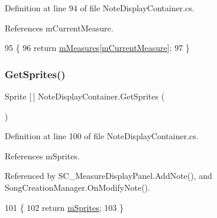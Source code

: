 Definition at line 94 of file Note\+Display\+Container.\+cs.



References m\+Current\+Measure.


\begin{DoxyCode}
95     \{
96         \textcolor{keywordflow}{return} \hyperlink{class_note_display_container_ae5ca6e7ea4ab2baaab9ff649bf25c0d6}{mMeasures}[\hyperlink{class_note_display_container_a79a97c9e0f45ba4242b66d6ec317d020}{mCurrentMeasure}];
97     \}
\end{DoxyCode}
\mbox{\label{class_note_display_container_a71bea931f237005ffb04e33baef71bef}} 
\subsubsection{\texorpdfstring{Get\+Sprites()}{GetSprites()}}
{\footnotesize\ttfamily Sprite \mbox{[}$\,$\mbox{]} Note\+Display\+Container.\+Get\+Sprites (\begin{DoxyParamCaption}{ }\end{DoxyParamCaption})}



Definition at line 100 of file Note\+Display\+Container.\+cs.



References m\+Sprites.



Referenced by S\+C\+\_\+\+Measure\+Display\+Panel.\+Add\+Note(), and Song\+Creation\+Manager.\+On\+Modify\+Note().


\begin{DoxyCode}
101     \{
102         \textcolor{keywordflow}{return} \hyperlink{class_note_display_container_a2816b590b588d86780ae622b3df403ee}{mSprites};
103     \}
\end{DoxyCode}
\mbox{\label{class_note_display_container_a4d29c459fb7475f9daa86322307c3cd2}} 
